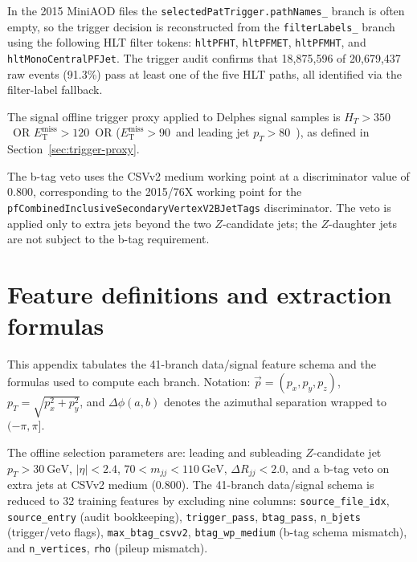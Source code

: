 \documentclass[11pt,a4paper,twocolumn]{article}
\newcommand{\GeV}{\text{GeV}}
\newcommand{\MET}{\ensuremath{E_{\mathrm{T}}^{\mathrm{miss}}}}
\begin{document}
In the 2015 MiniAOD files the \texttt{selectedPatTrigger.pathNames\_} branch
is often empty, so the trigger decision is reconstructed from the
\texttt{filterLabels\_} branch using the following HLT filter tokens:
\texttt{hltPFHT}, \texttt{hltPFMET}, \texttt{hltPFMHT}, and
\texttt{hltMonoCentralPFJet}. The trigger audit confirms that
18{,}875{,}596 of 20{,}679{,}437 raw events (91.3\%) pass at least one of
the five HLT paths, all identified via the filter-label fallback.

The signal offline trigger proxy applied to Delphes signal samples is
$H_T>350$~\GeV OR $\MET>120$~\GeV OR ($\MET>90$~\GeV and leading jet
$p_T>80$~\GeV), as defined in Section~\ref{sec:trigger-proxy}.

The b-tag veto uses the CSVv2 medium working point at a discriminator value
of 0.800, corresponding to the 2015/76X working point for the
\texttt{pfCombinedInclusiveSecondaryVertexV2BJetTags} discriminator. The
veto is applied only to extra jets beyond the two $Z$-candidate jets; the
$Z$-daughter jets are not subject to the b-tag requirement.

\section{Feature definitions and extraction formulas}
\label{app:features}

This appendix tabulates the 41-branch data/signal feature schema and the
formulas used to compute each branch. Notation: $\vec p = (p_x,p_y,p_z)$,
$p_T = \sqrt{p_x^2+p_y^2}$, and $\Delta\phi(a,b)$ denotes the azimuthal
separation wrapped to $(-\pi,\pi]$.

The offline selection parameters are: leading and subleading $Z$-candidate
jet $p_T > 30~\GeV$, $|\eta| < 2.4$, $70 < m_{jj} < 110~\GeV$,
$\Delta R_{jj} < 2.0$, and a b-tag veto on extra jets at CSVv2 medium
(0.800). The 41-branch data/signal schema is reduced to 32 training
features by excluding nine columns: \texttt{source\_file\_idx},
\texttt{source\_entry} (audit bookkeeping), \texttt{trigger\_pass},
\texttt{btag\_pass}, \texttt{n\_bjets} (trigger/veto flags),
\texttt{max\_btag\_csvv2}, \texttt{btag\_wp\_medium} (b-tag schema
mismatch), and \texttt{n\_vertices}, \texttt{rho} (pileup mismatch).
\end{document}
